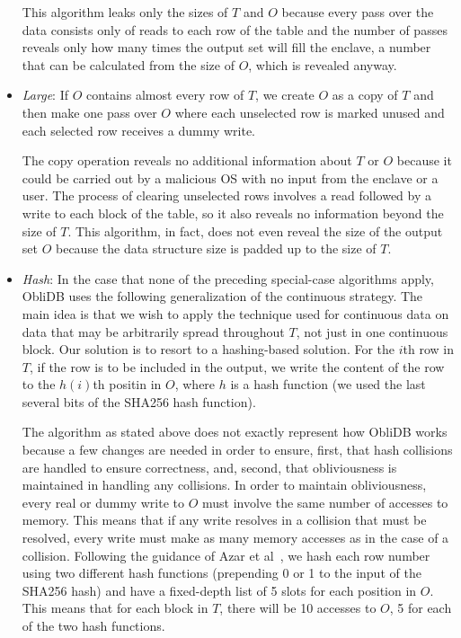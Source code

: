 \documentclass[letterpaper,twocolumn,10pt]{article}
\def\name/{ObliDB}
\begin{document}
\begin{itemize}[itemsep=0pt,parsep=0pt]
This algorithm leaks only the sizes of $T$ and $O$ because every pass over the data consists only of reads to each row of the table and the number of passes reveals only how many times the output set will fill the enclave, a number that can be calculated from the size of $O$, which is revealed anyway. 

\item \textit{Large}: If $O$ contains almost every row of $T$, we create $O$ as a copy of $T$ and then make one pass over $O$ where each unselected row is marked unused and each selected row receives a dummy write. 

The copy operation reveals no additional information about $T$ or $O$ because it could be carried out by a malicious OS with no input from the enclave or a user. The process of clearing unselected rows involves a read followed by a write to each block of the table, so it also reveals no information beyond the size of $T$. This algorithm, in fact, does not even reveal the size of the output set $O$ because the data structure size is padded up to the size of $T$. 

\item \textit{Hash}: In the case that none of the preceding special-case algorithms apply, \name/ uses the following generalization of the continuous strategy. The main idea is that we wish to apply the technique used for continuous data on data that may be arbitrarily spread throughout $T$, not just in one continuous block. Our solution is to resort to a hashing-based solution. For the $i$th row in $T$, if the row is to be included in the output, we write the content of the row to the $h(i)$th positin in $O$, where $h$ is a hash function (we used the last several bits of the SHA256 hash function).

The algorithm as stated above does not exactly represent how \name/ works because a few changes are needed in order to ensure, first, that hash collisions are handled to ensure correctness, and, second, that obliviousness is maintained in handling any collisions. In order to maintain obliviousness, every real or dummy write to $O$ must involve the same number of accesses to memory. This means that if any write resolves in a collision that must be resolved, every write must make as many memory accesses as in the case of a collision. Following the guidance of Azar et al~\cite{ABKU99}, we hash each row number using two different hash functions (prepending 0 or 1 to the input of the SHA256 hash) and have a fixed-depth list of 5 slots for each position in $O$. This means that for each block in $T$, there will be 10 accesses to $O$, 5 for each of the two hash functions. 


\end{itemize}
\end{document}
